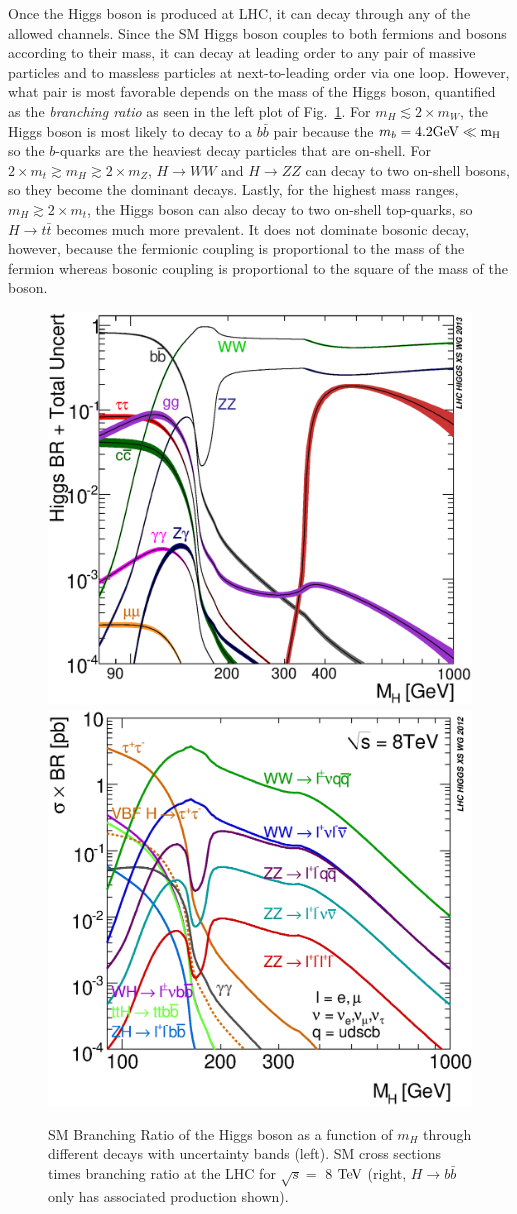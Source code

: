 Once the Higgs boson is produced at LHC, it can decay through any of the allowed channels. Since the SM Higgs boson couples to both fermions and bosons according to their mass, it can decay at leading order to any pair of massive particles and to massless particles at next-to-leading order via one loop. However, what pair is most favorable depends on the mass of the Higgs boson, quantified as the \textit{branching ratio} as seen in the left plot of Fig.~\ref{fig:HXSWGDecay}. For $m_H\lesssim2\times m_W$, the Higgs boson is most likely to decay to a $b\bar{b}$ pair because the $m_b = 4.2 \rm{GeV} \ll m_H$ so the $b$-quarks are the heaviest decay particles that are on-shell. For $2\times m_t \gtrsim m_H \gtrsim 2\times m_Z$, $H\rightarrow WW$ and $H\rightarrow ZZ$ can decay to two on-shell bosons, so they become the dominant decays. Lastly, for the highest mass ranges, $m_H \gtrsim 2\times m_t$, the Higgs boson can also decay to two on-shell top-quarks, so $H\rightarrow t\bar{t}$ becomes much more prevalent. It does not dominate bosonic decay, however, because the fermionic coupling is proportional to the mass of the fermion whereas bosonic coupling is proportional to the square of the mass of the boson.

\begin{figure}[htbp]
\begin{center}
\includegraphics[width=.45\linewidth]{Phenomenology/figures/Higgs_BR}
\includegraphics[width=.45\linewidth]{Phenomenology/figures/XSBR_8TeV_SM_HM}
\caption[Standard Model Decay Branching Ratios for the Higgs at the LHC as a Function of the Higgs' Mass]{SM Branching Ratio of the Higgs boson as a function of $m_H$ through different decays with uncertainty bands (left). SM cross sections times branching ratio at the LHC for $\sqrt{s}=$ 8 $\rm{TeV}$ (right, $H\rightarrow b\bar{b}$ only has associated production shown).~\cite{HXSWG_Properties}}
\label{fig:HXSWGDecay}
\end{center}
\end{figure}

